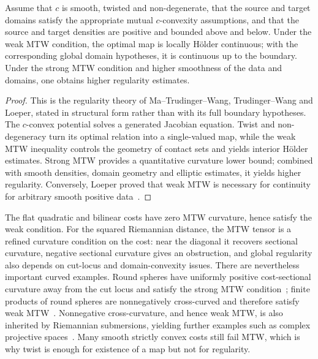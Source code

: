 \begin{prop}\label{prop-mtw-regularity-implication}
	Assume that $c$ is smooth, twisted and non-degenerate, that the source and target domains satisfy the appropriate mutual $c$-convexity assumptions, and that the source and target densities are positive and bounded above and below. Under the weak MTW condition, the optimal map is locally H\"older continuous; with the corresponding global domain hypotheses, it is continuous up to the boundary. Under the strong MTW condition and higher smoothness of the data and domains, one obtains higher regularity estimates.
\end{prop}
\begin{proof}
	This is the regularity theory of Ma--Trudinger--Wang, Trudinger--Wang and Loeper, stated in structural form rather than with its full boundary hypotheses. The $c$-convex potential solves a generated Jacobian equation. Twist and non-degeneracy turn its optimal relation into a single-valued map, while the weak MTW inequality controls the geometry of contact sets and yields interior H\"older estimates. Strong MTW provides a quantitative curvature lower bound; combined with smooth densities, domain geometry and elliptic estimates, it yields higher regularity. Conversely, Loeper proved that weak MTW is necessary for continuity for arbitrary smooth positive data~\cite{ma2005regularity,trudinger2001monge,loeper2009regularity,Villani09}.
\end{proof}

The flat quadratic and bilinear costs have zero MTW curvature, hence satisfy the weak condition. For the squared Riemannian distance, the MTW tensor is a refined curvature condition on the cost: near the diagonal it recovers sectional curvature, negative sectional curvature gives an obstruction, and global regularity also depends on cut-locus and domain-convexity issues. There are nevertheless important curved examples. Round spheres have uniformly positive cost-sectional curvature away from the cut locus and satisfy the strong MTW condition~\cite{Loeper2011Sphere}; finite products of round spheres are nonnegatively cross-curved and therefore satisfy weak MTW~\cite{KimMcCann2012,FigalliKimMcCann2013}. Nonnegative cross-curvature, and hence weak MTW, is also inherited by Riemannian submersions, yielding further examples such as complex projective spaces~\cite{KimMcCann2012}. Many smooth strictly convex costs still fail MTW, which is why twist is enough for existence of a map but not for regularity.

